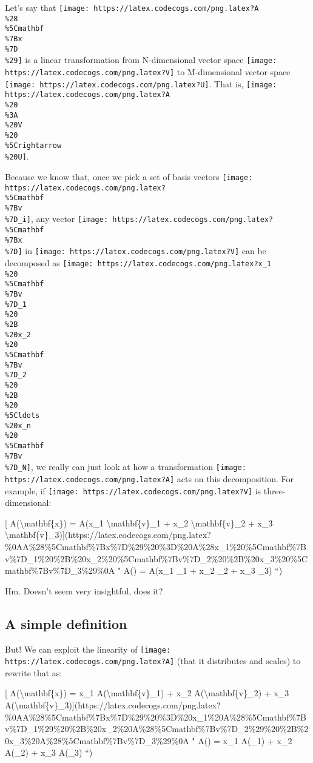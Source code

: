 \documentclass[]{article}
\begin{document}
Let's say that
\texttt{[image: https://latex.codecogs.com/png.latex?A\\\%28\\\%5Cmathbf\\\%7Bx\\\%7D\\\%29]}
is a linear transformation from N-dimensional vector space
\texttt{[image: https://latex.codecogs.com/png.latex?V]} to M-dimensional vector
space \texttt{[image: https://latex.codecogs.com/png.latex?U]}. That is,
\texttt{[image: https://latex.codecogs.com/png.latex?A\\\%20\\\%3A\\\%20V\\\%20\\\%5Crightarrow\\\%20U]}.

Because we know that, once we pick a set of basis vectors
\texttt{[image: https://latex.codecogs.com/png.latex?\\\%5Cmathbf\\\%7Bv\\\%7D\_i]},
any vector
\texttt{[image: https://latex.codecogs.com/png.latex?\\\%5Cmathbf\\\%7Bx\\\%7D]} in
\texttt{[image: https://latex.codecogs.com/png.latex?V]} can be decomposed as
\texttt{[image: https://latex.codecogs.com/png.latex?x\_1\\\%20\\\%5Cmathbf\\\%7Bv\\\%7D\_1\\\%20\\\%2B\\\%20x\_2\\\%20\\\%5Cmathbf\\\%7Bv\\\%7D\_2\\\%20\\\%2B\\\%20\\\%5Cldots\\\%20x\_n\\\%20\\\%5Cmathbf\\\%7Bv\\\%7D\_N]},
we really can just look at how a transformation
\texttt{[image: https://latex.codecogs.com/png.latex?A]} acts on this
decomposition. For example, if
\texttt{[image: https://latex.codecogs.com/png.latex?V]} is three-dimensional:

{[} A(\textbackslash{}mathbf\{x\}) = A(x\_1 \textbackslash{}mathbf\{v\}\_1 +
x\_2 \textbackslash{}mathbf\{v\}\_2 + x\_3
\textbackslash{}mathbf\{v\}\_3){]}(https://latex.codecogs.com/png.latex?\%0AA\%28\%5Cmathbf\%7Bx\%7D\%29\%20\%3D\%20A\%28x\_1\%20\%5Cmathbf\%7Bv\%7D\_1\%20\%2B\%20x\_2\%20\%5Cmathbf\%7Bv\%7D\_2\%20\%2B\%20x\_3\%20\%5Cmathbf\%7Bv\%7D\_3\%29\%0A
" A() = A(x\_1 \_1 + x\_2 \_2 + x\_3
\_3) ``)

Hm. Doesn't seem very insightful, does it?

\hypertarget{a-simple-definition}{%
\subsection{A simple definition}\label{a-simple-definition}}

But! We can exploit the linearity of
\texttt{[image: https://latex.codecogs.com/png.latex?A]} (that it distributes
and scales) to rewrite that as:

{[} A(\textbackslash{}mathbf\{x\}) = x\_1 A(\textbackslash{}mathbf\{v\}\_1) +
x\_2 A(\textbackslash{}mathbf\{v\}\_2) + x\_3
A(\textbackslash{}mathbf\{v\}\_3){]}(https://latex.codecogs.com/png.latex?\%0AA\%28\%5Cmathbf\%7Bx\%7D\%29\%20\%3D\%20x\_1\%20A\%28\%5Cmathbf\%7Bv\%7D\_1\%29\%20\%2B\%20x\_2\%20A\%28\%5Cmathbf\%7Bv\%7D\_2\%29\%20\%2B\%20x\_3\%20A\%28\%5Cmathbf\%7Bv\%7D\_3\%29\%0A
" A() = x\_1 A(\_1) + x\_2 A(\_2) + x\_3
A(\_3) ``)
\end{document}
